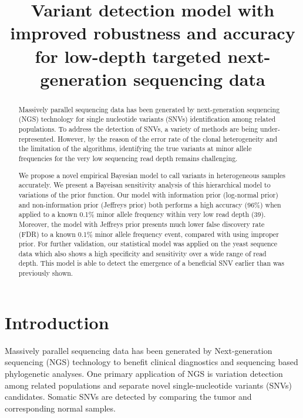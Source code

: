 \documentclass[11pt,reqno]{amsart}
\title[RVD3]{Variant detection model with improved robustness and accuracy for low-depth targeted next-generation sequencing data}
\author{}
\begin{document}
\begin{abstract}
Massively parallel sequencing data has been generated by next-generation sequencing (NGS) technology for single nucleotide variants (SNVs) identification among related populations.
To address the detection of SNVs, a variety of methods are being under-represented.
However, by the reason of the error rate of the clonal heterogeneity and the limitation of the algorithms, identifying the true variants at minor allele frequencies for the very low sequencing read depth remains challenging.

We propose a novel empirical Bayesian model to call variants in heterogeneous samples accurately. We present a Bayeisan sensitivity analysis of this hierarchical model to variations of the prior function.
Our model with information prior (log-normal prior) and non-information prior (Jeffreys prior) both performs a high accuracy (96\%) when applied to a known 0.1\% minor allele frequency within very low read depth (39).
Moreover, the model with Jeffreys prior presents much lower false discovery rate (FDR) to a known 0.1\% minor allele frequency event, compared with using improper prior.
For further validation, our statistical model was applied on the yeast sequence data which also shows a high specificity and sensitivity over a wide range of read depth.
This model is able to detect the emergence of a beneficial SNV earlier than was previously shown.

\end{abstract}

\maketitle

\section{Introduction}

Massively parallel sequencing data has been generated by Next-generation sequencing (NGS) technology to benefit clinical diagnostics and sequencing based phylogenetic analyses.
One primary application of NGS is variation detection among related populations and separate novel single-nucleotide variants (SNVs) candidates.
Somatic SNVs are detected by comparing the tumor and corresponding normal samples.
\end{document}

